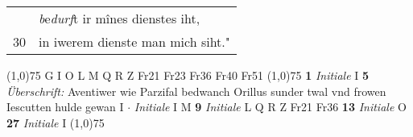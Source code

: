 \documentclass[8pt,a4paper,notitlepage]{article}
\begin{document}
\begin{table}[ht]
\begin{minipage}[t]{0.5\linewidth}
\begin{tabular}{rl}
 & \textit{b}e\textit{durf}t ir mînes dienstes iht,\\ 
30 & in iwerem dienste man mich siht."\\ 
\end{tabular}
\scriptsize
\line(1,0){75} \newline
G I O L M Q R Z Fr21 Fr23 Fr36 Fr40 Fr51 \newline
\line(1,0){75} \newline
\textbf{1} \textit{Initiale} I  \textbf{5} \textit{Überschrift:} Aventiwer wie Parzifal bedwanch Orillus sunder twal vnd frowen Iescutten hulde gewan I   $\cdot$ \textit{Initiale} I M  \textbf{9} \textit{Initiale} L Q R Z Fr21 Fr36  \textbf{13} \textit{Initiale} O  \textbf{27} \textit{Initiale} I  \newline
\line(1,0){75} \newline

\end{minipage}
\end{table}
\end{document}
